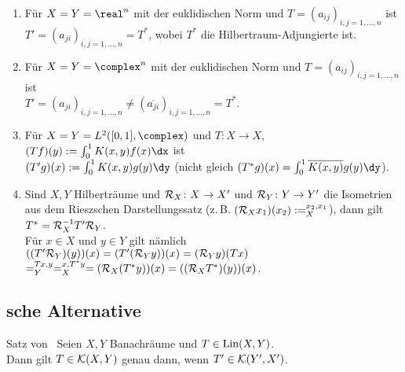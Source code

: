 \begin{Bsp}
    \begin{enumerate}[label=\emph{(\alph*)}]
        \item
        Für $X = Y = \real^n$ mit der euklidischen Norm und
        $T = (a_{ij})_{i,j=1,\dotsc,n}$ ist\\
        $T' = (a_{ji})_{i,j=1,\dotsc,n} = T^\ast$,
        wobei $T^\ast$ die Hilbertraum-Adjungierte ist.
        
        \item
        Für $X = Y = \complex^n$ mit der euklidischen Norm und
        $T = (a_{ij})_{i,j=1,\dotsc,n}$ ist\\
        $T' = (a_{ji})_{i,j=1,\dotsc,n} \not= (\overline{a_{ji}})_{i,j=1,\dotsc,n} = T^\ast$.
        
        \item
        Für $X = Y = L^2([0,1], \complex)$ und
        $T\colon X \rightarrow X$,
        $(Tf)(y) := \int_0^1 K(x, y)f(x)\dx$ ist\\
        $(T'g)(x) := \int_0^1 K(x, y)g(y)\dy$
        (nicht gleich
        $(T^\ast g)(x) = \int_0^1 \overline{K(x, y)} g(y) \dy$).
        
        \item
        Sind $X, Y$ Hilberträume und $\mathcal{R}_X\colon X \rightarrow X'$ und
        $\mathcal{R}_Y\colon Y \rightarrow Y'$ die Isometrien aus dem Rieszschen Darstellungssatz
        (z.\,B. $(\mathcal{R}_X x_1)(x_2) := \sp{x_2, x_1}_X$),
        dann gilt $T^\ast = \mathcal{R}_X^{-1} T' \mathcal{R}_Y$.\\
        Für $x \in X$ und $y \in Y$ gilt nämlich
        $((T' \mathcal{R}_Y)(y))(x)
        = (T'(\mathcal{R}_Y y))(x)
        = (\mathcal{R}_Y y)(Tx)$\\
        $= \sp{Tx, y}_Y
        = \sp{x, T^\ast y}_X
        = (\mathcal{R}_X (T^\ast y))(x)
        = ((\mathcal{R}_X T^\ast)(y))(x)$.
    \end{enumerate}
\end{Bsp}

\pagebreak

\subsection{%
    sche Alternative%
}

\begin{Satz}{Satz von \scshape\,\!}
    Seien $X, Y$ Banachräume und $T \in \operatorname{Lin}(X, Y)$.\\
    Dann gilt $T \in \mathcal{K}(X, Y)$ genau dann, wenn $T' \in \mathcal{K}(Y', X')$.
\end{Satz}

